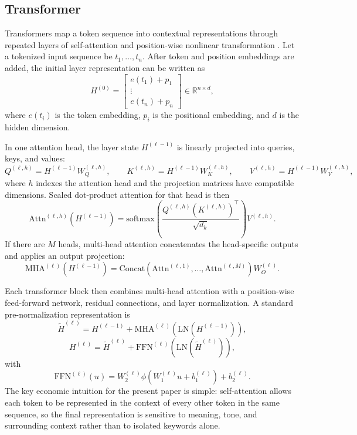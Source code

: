 \documentclass[11pt]{article}
\begin{document}
\subsection{Transformer}

Transformers map a token sequence into contextual representations through repeated layers of self-attention and position-wise nonlinear transformation \citep{vaswani2017}. Let a tokenized input sequence be $t_1,\dots,t_n$. After token and position embeddings are added, the initial layer representation can be written as
\[
H^{(0)}=
\begin{bmatrix}
e(t_1)+p_1\\
\vdots\\
e(t_n)+p_n
\end{bmatrix}
\in \mathbb{R}^{n \times d},
\]
where $e(t_i)$ is the token embedding, $p_i$ is the positional embedding, and $d$ is the hidden dimension.

In one attention head, the layer state $H^{(\ell-1)}$ is linearly projected into queries, keys, and values:
\[
Q^{(\ell,h)} = H^{(\ell-1)}W_Q^{(\ell,h)}, \qquad
K^{(\ell,h)} = H^{(\ell-1)}W_K^{(\ell,h)}, \qquad
V^{(\ell,h)} = H^{(\ell-1)}W_V^{(\ell,h)},
\]
where $h$ indexes the attention head and the projection matrices have compatible dimensions. Scaled dot-product attention for that head is then
\[
\mathrm{Attn}^{(\ell,h)}(H^{(\ell-1)})
=
\mathrm{softmax}\!\left(
\frac{Q^{(\ell,h)}(K^{(\ell,h)})^\top}{\sqrt{d_k}}
\right)V^{(\ell,h)}.
\]
If there are $M$ heads, multi-head attention concatenates the head-specific outputs and applies an output projection:
\[
\mathrm{MHA}^{(\ell)}(H^{(\ell-1)})
=
\mathrm{Concat}\!\left(
\mathrm{Attn}^{(\ell,1)},\dots,\mathrm{Attn}^{(\ell,M)}
\right)W_O^{(\ell)}.
\]

Each transformer block then combines multi-head attention with a position-wise feed-forward network, residual connections, and layer normalization. A standard pre-normalization representation is
\[
\tilde{H}^{(\ell)}
=
H^{(\ell-1)} + \mathrm{MHA}^{(\ell)}\!\left(\mathrm{LN}(H^{(\ell-1)})\right),
\]
\[
H^{(\ell)}
=
\tilde{H}^{(\ell)} + \mathrm{FFN}^{(\ell)}\!\left(\mathrm{LN}(\tilde{H}^{(\ell)})\right),
\]
with
\[
\mathrm{FFN}^{(\ell)}(u)=W_2^{(\ell)}\phi\!\left(W_1^{(\ell)}u+b_1^{(\ell)}\right)+b_2^{(\ell)}.
\]
The key economic intuition for the present paper is simple: self-attention allows each token to be represented in the context of every other token in the same sequence, so the final representation is sensitive to meaning, tone, and surrounding context rather than to isolated keywords alone.
\end{document}
